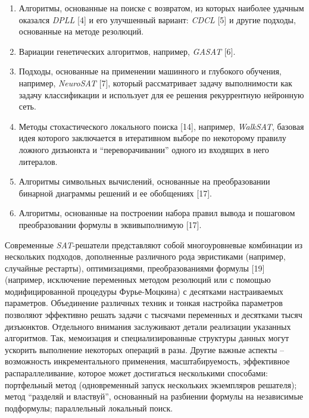 \begin{enumerate}[label=\arabic{*}.]

\item
Алгоритмы, основанные на поиске с возвратом, из которых наиболее удачным оказался \textit{DPLL} [4] и его улучшенный вариант: \textit{CDCL} [5] и другие подходы, основанные на методе резолюций.

\item
Вариации генетических алгоритмов, например, \textit{GASAT} [6].

\item
Подходы, основанные на применении машинного и глубокого обучения, например, \textit{NeuroSAT} [7], который рассматривает задачу выполнимости как задачу классификации и использует для ее решения рекуррентную нейронную сеть.

\item
Методы стохастического локального поиска [14], например, \textit{WalkSAT}, базовая идея которого заключается в итеративном выборе по некоторому правилу ложного дизъюнкта и \enquote{переворачивании} одного из входящих в него литералов.

\item
Алгоритмы символьных вычислений, основанные на преобразовании бинарной диаграммы решений и ее обобщениях [17].

\item
Алгоритмы, основанные на построении набора правил вывода и пошаговом преобразовании формулы в эквивыполнимую [17].

\end{enumerate}


Современные \textit{SAT}-решатели представляют собой многоуровневые комбинации из нескольких подходов, дополненные различного рода эвристиками (например, случайные рестарты), оптимизациями, преобразованиями формулы [19] (например, исключение переменных методом резолюций или с помощью модифицированной процедуры Фурье-Моцкина) с десятками настраиваемых параметров. Объединение различных техник и тонкая настройка параметров позволяют эффективно решать задачи с тысячами переменных и десятками тысяч дизъюнктов. Отдельного внимания заслуживают детали реализации указанных алгоритмов. Так, мемоизация и специализированные структуры данных могут ускорить выполнение некоторых операций в разы. Другие важные аспекты – возможность инкрементального применения, масштабируемость, эффективное распараллеливание, которое может достигаться несколькими способами: портфельный метод (одновременный запуск нескольких экземпляров решателя); метод \enquote{разделяй и властвуй}, основанный на разбиении формулы на независимые подформулы; параллельный локальный поиск.

